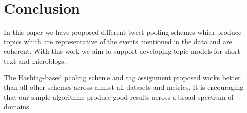 \documentclass[10pt,a5paper,twoside]{article}
\begin{document}
\section{Conclusion}
In this paper we have proposed different tweet pooling schemes which produce topics which are representative of the events mentioned in the data and are coherent. With this work we aim to support%
developing topic models for short text and microblogs. %

The Hashtag-based pooling scheme and tag assignment proposed works better than all other schemes across almost all datasets and metrics. It is encouraging that our simple algorithms produce good results across a broad spectrum of domains.

%


%
%




%
%




%

\end{document}
